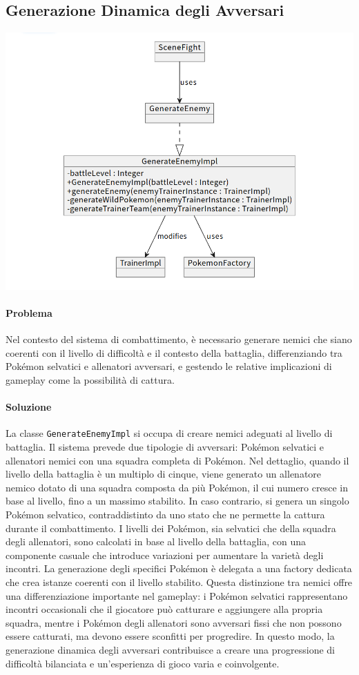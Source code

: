\documentclass[a4paper,12pt]{report}
\begin{document}
{{\subsection*{Generazione Dinamica degli Avversari}
\includegraphics[width=\textwidth]{immagini/generateEnemyUML.png}
\paragraph{Problema}
Nel contesto del sistema di combattimento, è necessario generare nemici che siano coerenti con il livello di difficoltà e il contesto della battaglia, differenziando tra Pokémon selvatici e allenatori avversari, e gestendo le relative implicazioni di gameplay come la possibilità di cattura.

\paragraph{Soluzione}
La classe \texttt{GenerateEnemyImpl} si occupa di creare nemici adeguati al livello di battaglia. Il sistema prevede due tipologie di avversari: Pokémon selvatici e allenatori nemici con una squadra completa di Pokémon. Nel dettaglio, quando il livello della battaglia è un multiplo di cinque, viene generato un allenatore nemico dotato di una squadra composta da più Pokémon, il cui numero cresce in base al livello, fino a un massimo stabilito. In caso contrario, si genera un singolo Pokémon selvatico, contraddistinto da uno stato che ne permette la cattura durante il combattimento.
I livelli dei Pokémon, sia selvatici che della squadra degli allenatori, sono calcolati in base al livello della battaglia, con una componente casuale che introduce variazioni per aumentare la varietà degli incontri. La generazione degli specifici Pokémon è delegata a una factory dedicata che crea istanze coerenti con il livello stabilito.
Questa distinzione tra nemici offre una differenziazione importante nel gameplay: i Pokémon selvatici rappresentano incontri occasionali che il giocatore può catturare e aggiungere alla propria squadra, mentre i Pokémon degli allenatori sono avversari fissi che non possono essere catturati, ma devono essere sconfitti per progredire. In questo modo, la generazione dinamica degli avversari contribuisce a creare una progressione di difficoltà bilanciata e un’esperienza di gioco varia e coinvolgente.

}}
\end{document}
